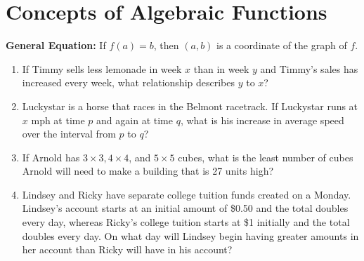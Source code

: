 \section[Algebraic Functions]{Concepts of Algebraic Functions}

\bigskip
\textbf{General Equation:} If $f(a)=b$, then $(a,b)$ is a coordinate of the graph of $f$.

\vfill
\begin{enumerate}[labelindent=*,style=multiline,leftmargin=*,label=\textbf{Example \arabic*:}]
\item If Timmy sells less lemonade in week $x$ than in week $y$ and Timmy's sales has increased every week, what relationship describes $y$ to $x$?

\vfill\item Luckystar is a horse that races in the Belmont racetrack. If Luckystar runs at $x$ mph at time $p$ and again at time $q$, what is his increase in average speed over the interval from $p$ to $q$?

\vfill\item If Arnold has $3\times3, 4\times4$, and $5\times5$ cubes, what is the least number of cubes Arnold will need to make a building that is 27 units high?

\vfill\item Lindsey and Ricky have separate college tuition funds created on a Monday. Lindsey's account starts at an initial amount of \$0.50 and the total doubles every day, whereas Ricky's college tuition starts at \$1 initially and the total doubles every day. On what day will Lindsey begin having greater amounts in her account than Ricky will have in his account?
\end{enumerate}

